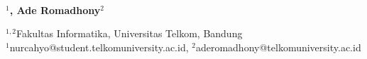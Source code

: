  
  \begin{center}
      \textbf{\large \Title}\\
      \bigskip 
  \end{center}
  
  
  
   \begin{center}
     \bf \Author$^1$, Ade Romadhony$^2$
  \end{center}
  
  
   \begin{center}
      $^{1,2}$Fakultas Informatika, Universitas Telkom, Bandung\\
      $^1$nurcahyo@student.telkomuniversity.ac.id, $^2$aderomadhony@telkomuniversity.ac.id
  \end{center}
  
   
   
